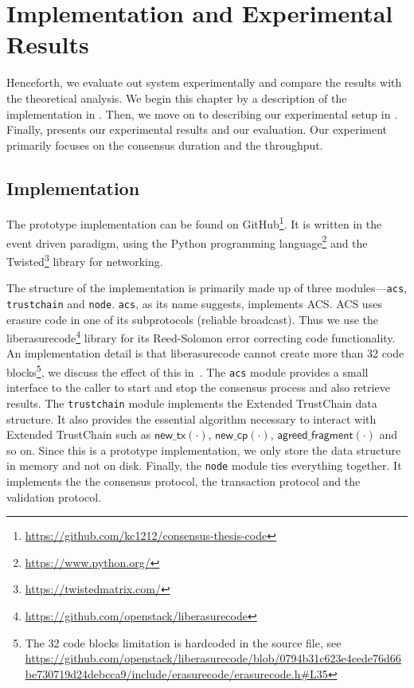 \chapter{Implementation and Experimental Results}
\label{ch:implementation}

Henceforth, we evaluate out system experimentally and compare the results with the theoretical analysis.
We begin this chapter by a description of the implementation in .
Then, we move on to describing our experimental setup in .
Finally,  presents our experimental results and our evaluation.
Our experiment primarily focuses on the consensus duration and the throughput.


\section{Implementation}
\label{sec:implementation}

The prototype implementation can be found on GitHub\footnote{\url{https://github.com/kc1212/consensus-thesis-code}}.
It is written in the event driven paradigm, using the Python programming language\footnote{\url{https://www.python.org/}} and
the Twisted\footnote{\url{https://twistedmatrix.com/}} library for networking.

The structure of the implementation is primarily made up of three modules---\texttt{acs}, \texttt{trustchain} and \texttt{node}.
\texttt{acs}, as its name suggests, implements ACS.
ACS uses erasure code in one of its subprotocols (reliable broadcast).
Thus we use the liberasurecode\footnote{\url{https://github.com/openstack/liberasurecode}} library for its Reed-Solomon error correcting code functionality.
An implementation detail is that liberasurecode cannot create more than 32 code blocks\footnote{
  The 32 code blocks limitation is hardcoded in the source file, see
  \url{https://github.com/openstack/liberasurecode/blob/0794b31c623e4cede76d66be730719d24debcca9/include/erasurecode/erasurecode.h\#L35}
}, we discuss the effect of this in~.
The \texttt{acs} module provides a small interface to the caller to start and stop the consensus process and also retrieve results.
The \texttt{trustchain} module implements the Extended TrustChain data structure.
It also provides the essential algorithm necessary to interact with Extended TrustChain such as 
$\textsf{new\_tx}(\cdot)$, $\textsf{new\_cp}(\cdot)$, $\textsf{agreed\_fragment}(\cdot)$ and so on.
Since this is a prototype implementation, we only store the data structure in memory and not on disk.
Finally, the \texttt{node} module ties everything together.
It implements the the consensus protocol, the transaction protocol and the validation protocol.

